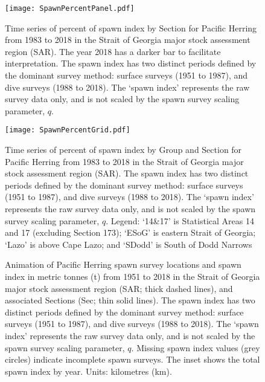 \documentclass[12pt]{article}\usepackage[]{graphicx}\usepackage[]{color}
\newcommand{\regionName}{Strait of Georgia}
\newcommand{\regionType}{major}
\newcommand{\thisYr}{2018}
\newcommand{\fishName}{Pacific Herring}
\newcommand{\spawnIndex}{The `spawn index' represents the raw survey data only, and is not scaled by the spawn survey scaling parameter, $q$.}
\newcommand{\qPeriods}{The spawn index has two distinct periods defined by the dominant survey method: surface surveys (1951 to 1987), and dive surveys (1988 to 2018).}
\newcommand{\darkThisYr}{The year \thisYr{} has a darker bar to facilitate interpretation.}
\newcommand{\missingSpawn}[1]{Missing spawn index values (#1) indicate incomplete spawn surveys.}
\begin{document}
\begin{figure}[h]
\centering
\texttt{[image: SpawnPercentPanel.pdf]}
\caption{Time series of percent of spawn index by Section for \fishName{} from 1983 to \thisYr{} in the \regionName{} \regionType{} stock assessment region (SAR). 
\darkThisYr{}
\qPeriods{}
\spawnIndex{}}
\label{figSpawnPercentPanel}
\end{figure}

\begin{figure}[h]
\centering
\texttt{[image: SpawnPercentGrid.pdf]}
\caption{Time series of percent of spawn index by Group and Section for \fishName{} from 1983 to \thisYr{} in the \regionName{} \regionType{} stock assessment region (SAR). 
\qPeriods{}
\spawnIndex{}
Legend: `14\&17' is Statistical Areas 14 and 17
      (excluding Section 173); `ESoG' is eastern Strait of Georgia; 
      `Lazo' is above Cape Lazo; and `SDodd' is South of Dodd Narrows}
\label{figSpawnPercentGrid}
\end{figure}

\begin{figure}[h]
\centering
{}
\caption{Animation of \fishName{} spawn survey locations and spawn index in metric tonnes (t) from 1951 to \thisYr{} in the \regionName{} \regionType{} stock assessment region (SAR; thick dashed lines), and associated Sections (Sec; thin solid lines).
\qPeriods{}
\spawnIndex{}
\missingSpawn{grey circles}
The inset shows the total spawn index by year.
Units: kilometres (km).}
\label{figSpawnIndexAnimation}
\end{figure}

\end{document}
